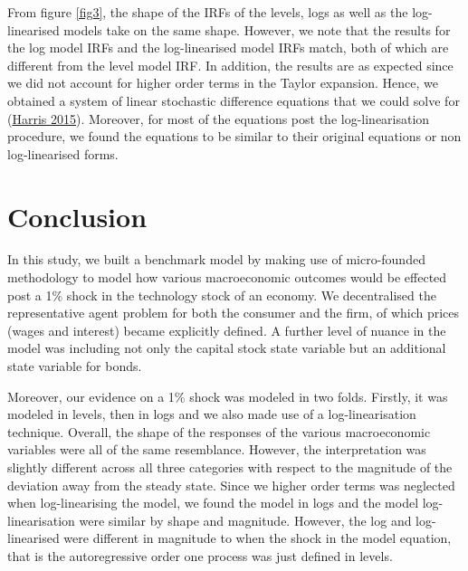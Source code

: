 \documentclass[
  11pt,
  justified]{article}
\begin{document}
From figure \ref{fig3}, the shape of the IRFs of the levels, logs as
well as the log-linearised models take on the same shape. However, we
note that the results for the log model IRFs and the log-linearised
model IRFs match, both of which are different from the level model IRF.
In addition, the results are as expected since we did not account for
higher order terms in the Taylor expansion. Hence, we obtained a system
of linear stochastic difference equations that we could solve for
(\protect\hyperlink{ref-harris2015}{Harris 2015}). Moreover, for most of
the equations post the log-linearisation procedure, we found the
equations to be similar to their original equations or non
log-linearised forms.

\newpage

\hypertarget{conclusion}{%
\section{Conclusion}\label{conclusion}}

In this study, we built a benchmark model by making use of micro-founded
methodology to model how various macroeconomic outcomes would be
effected post a 1\% shock in the technology stock of an economy. We
decentralised the representative agent problem for both the consumer and
the firm, of which prices (wages and interest) became explicitly
defined. A further level of nuance in the model was including not only
the capital stock state variable but an additional state variable for
bonds.

Moreover, our evidence on a 1\% shock was modeled in two folds. Firstly,
it was modeled in levels, then in logs and we also made use of a
log-linearisation technique. Overall, the shape of the responses of the
various macroeconomic variables were all of the same resemblance.
However, the interpretation was slightly different across all three
categories with respect to the magnitude of the deviation away from the
steady state. Since we higher order terms was neglected when
log-linearising the model, we found the model in logs and the model
log-linearisation were similar by shape and magnitude. However, the log
and log-linearised were different in magnitude to when the shock in the
model equation, that is the autoregressive order one process was just
defined in levels.
\end{document}
